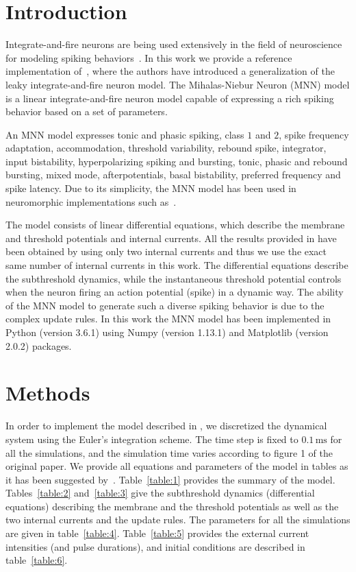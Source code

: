 \documentclass[10pt,a4paper,onecolumn]{article}
\newcommand{\Rm}[1]{\mathrm{#1}}
\begin{document}
\section{Introduction}\label{introduction}

Integrate-and-fire neurons are being used extensively in the field of 
neuroscience for modeling spiking behaviors~\cite{dayan:2001}. In this work we
provide a reference implementation of~\cite{mihalas:2009}, where the authors
have introduced a generalization of the leaky integrate-and-fire neuron model. 
The Mihalas-Niebur Neuron (MNN) model is a linear integrate-and-fire neuron
model capable of expressing a rich spiking behavior based on a set of 
parameters.

An MNN model expresses tonic and phasic spiking, class $1$ and $2$, spike
frequency adaptation, accommodation, threshold variability, rebound spike,
integrator, input bistability, hyperpolarizing spiking and bursting, tonic,
phasic and rebound bursting, mixed mode, afterpotentials, basal bistability, 
preferred frequency and spike latency. 
Due to its simplicity, the MNN model has been used in neuromorphic 
implementations such as~\cite{folowosele:2011}. 

The model consists of linear differential equations, which describe the membrane
and threshold potentials and internal currents. All the results provided in 
\cite{mihalas:2009} have been obtained by using only two internal currents and
thus we use the exact same number of internal currents in this work. The
differential equations describe the subthreshold dynamics, while the 
instantaneous threshold potential controls when the neuron firing an action 
potential (spike) in a dynamic way. The ability of the MNN model to generate
such a diverse spiking behavior is due to the complex update rules. In this 
work the MNN model has been implemented in Python (version 3.6.1) using 
Numpy (version 1.13.1) and Matplotlib (version 2.0.2) packages. 



\section{Methods}\label{methods}

In order to implement the model described in \cite{mihalas:2009}, we discretized
the dynamical system using the Euler's integration scheme. The time step is 
fixed to $0.1\, \Rm{ms}$ for all the simulations, and the simulation time
varies according to figure 1 of the original paper. We provide all equations
and parameters of the model in tables as it has been suggested
by~\cite{nordlie:2009}. 
Table~\ref{table:1} provides the summary of the model. Tables~\ref{table:2}
and~\ref{table:3} give the subthreshold dynamics (differential equations) 
describing the membrane and the threshold potentials as well as the two internal
currents and the update rules. The parameters for all the simulations are given
in table~\ref{table:4}. Table~\ref{table:5} provides the external current
intensities (and pulse durations), and initial conditions are described
in table~\ref{table:6}. 
\end{document}
